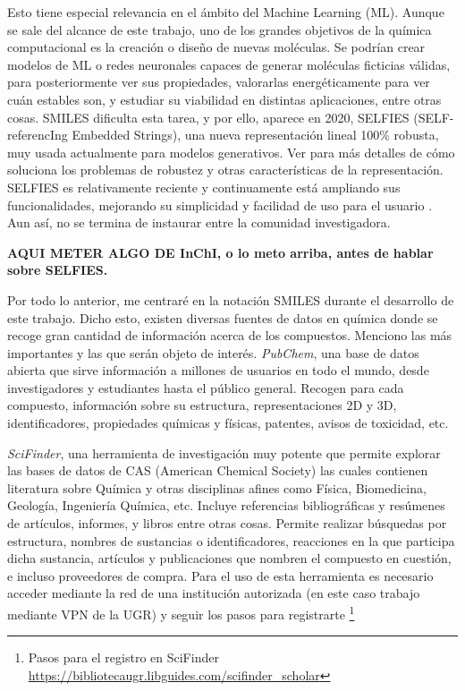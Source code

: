 Esto tiene especial relevancia en el ámbito del Machine Learning (ML). Aunque se sale del alcance de este trabajo, uno de los grandes objetivos de la química computacional es la creación o diseño de nuevas moléculas. Se podrían crear modelos de ML o redes neuronales capaces de generar moléculas ficticias válidas, para posteriormente ver sus propiedades, valorarlas energéticamente para ver cuán estables son, y estudiar su viabilidad en distintas aplicaciones, entre otras cosas. SMILES dificulta esta tarea, y por ello, aparece en 2020, SELFIES (SELF-referencIng Embedded Strings), una nueva representación lineal 100\% robusta, muy usada actualmente para modelos generativos. Ver \cite{SELFIES, krenn_self_referencing_2020} para más detalles de cómo soluciona los problemas de robustez y otras características de la representación. SELFIES es relativamente reciente y continuamente está ampliando sus funcionalidades, mejorando su simplicidad y facilidad de uso para el usuario \cite{selfies_recent_2023}. Aun así, no se termina de instaurar entre la comunidad investigadora. 

\textbf{AQUI METER ALGO DE InChI, o lo meto arriba, antes de hablar sobre SELFIES.
}

Por todo lo anterior, me centraré en la notación SMILES durante el desarrollo de este trabajo. Dicho esto, existen diversas fuentes de datos en química donde se recoge gran cantidad de información acerca de los compuestos. Menciono las más importantes y las que serán objeto de interés. \emph{PubChem}, una base de datos abierta que sirve información a millones de usuarios en todo el mundo, desde investigadores y estudiantes hasta el público general. Recogen para cada compuesto, información sobre su estructura, representaciones 2D y 3D, identificadores, propiedades químicas y físicas, patentes, avisos de toxicidad, etc. \cite{pubchem_website} 

\emph{SciFinder}, una herramienta de investigación muy potente que permite explorar las bases de datos de CAS (American Chemical Society) las cuales contienen literatura sobre Química y otras disciplinas afines como Física, Biomedicina, Geología, Ingeniería Química, etc. Incluye referencias bibliográficas y resúmenes de artículos, informes, y libros entre otras cosas. Permite realizar búsquedas por estructura, nombres de sustancias o identificadores, reacciones en la que participa dicha sustancia, artículos y publicaciones que nombren el compuesto en cuestión, e incluso proveedores de compra. Para el uso de esta herramienta es necesario acceder mediante la red de una institución autorizada (en este caso trabajo mediante VPN de la UGR) y seguir los pasos para registrarte \footnote{Pasos para el registro en SciFinder \url{https://bibliotecaugr.libguides.com/scifinder_scholar}}

